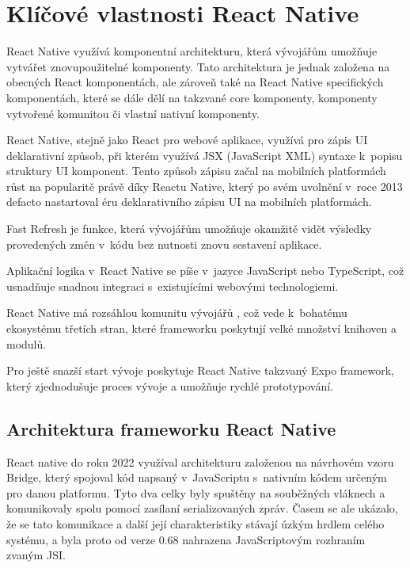 \section*{Klíčové vlastnosti React Native}

React Native využívá komponentní architekturu, která vývojářům umožňuje 
vytvářet znovupoužitelné komponenty. \cite{reactNativeComponents} Tato architektura je jednak založena na obecných
React komponentách, ale zároveň také na React Native specifických komponentách, které se dále dělí na takzvané core
komponenty, komponenty vytvořené komunitou či vlastní nativní komponenty. \cite{reactNativeComponents}

    
React Native, stejně jako React pro webové aplikace, využívá pro zápis UI deklarativní způsob, 
při kterém využívá JSX (JavaScript XML) syntaxe k~popisu struktury UI komponent. \cite{reactNativeJSX}
Tento způsob zápisu začal na mobilních platformách růst na popularitě právě díky Reactu Native, který po svém uvolnění v~roce 2013 
defacto nastartoval éru deklarativního zápisu UI na mobilních platformách. \cite{declarativeUIHistory}

Fast Refresh je funkce, která vývojářům umožňuje okamžitě vidět výsledky provedených 
změn v~kódu bez nutnosti znovu sestavení aplikace. \cite{reactNativeFastRefresh}

Aplikační logika v~React Native se píše v~jazyce JavaScript nebo TypeScript, 
což usnadňuje snadnou integraci s~existujícími webovými technologiemi. \cite{reactNativeFundamentals}

React Native má rozsáhlou komunitu vývojářů \cite{reactNativeComunity}, což vede k~bohatému ekosystému 
třetích stran, které frameworku poskytují velké množství knihoven a modulů. 

Pro ještě snazší start vývoje poskytuje React Native takzvaný Expo framework, který 
zjednodušuje proces vývoje a umožňuje rychlé prototypování. \cite{reactNativeExpo}

\subsection*{Architektura frameworku React Native}

React native do roku 2022 využíval architekturu založenou na návrhovém vzoru Bridge, který spojoval kód napsaný v~JavaScriptu s~nativním kódem určeným pro danou platformu. 
Tyto dva celky byly spuštěny na souběžných vláknech a komunikovaly spolu pomocí zasílaní serializovaných zpráv. Časem se ale ukázalo, že se tato komunikace
a další její charakteristiky stávají úzkým hrdlem celého systému, a byla proto od verze 0.68 nahrazena JavaScriptovým rozhraním zvaným JSI. \cite{reactNativeAboutNewArch}


